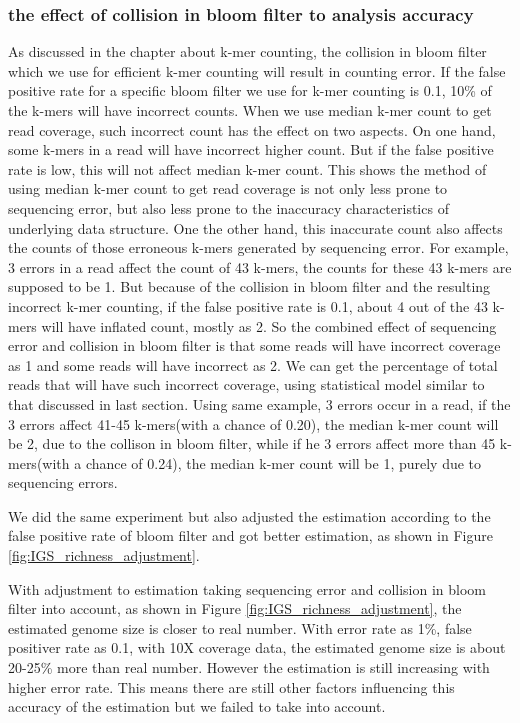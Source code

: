 \documentclass[12pt]{report}
\begin{document}
\subsubsection{the effect of collision in bloom filter to analysis accuracy}
As discussed in the chapter about k-mer counting, the collision in bloom filter
which we use for efficient k-mer counting will result in counting error. If the
false positive rate for a specific bloom filter we use for k-mer counting is
0.1, 10\% of the k-mers will have incorrect counts. When we use median k-mer
count to get read coverage, such incorrect count has the effect on two aspects.
On one hand, some k-mers in a read will have incorrect higher count. But if the
 false
positive rate is low, this will not affect median k-mer count. This shows the
method of using median k-mer count to get read coverage is not only less prone
to sequencing error, but also less prone to the inaccuracy characteristics of
underlying data structure. One the other hand, this inaccurate count also
affects the counts of those erroneous k-mers generated by sequencing error. For
example, 3 errors in a read affect the count of 43 k-mers, the counts for these
43 k-mers are supposed to be 1. But because of the collision in bloom filter
and the resulting incorrect k-mer counting, if the false positive rate is 0.1,
about 4 out of the 43 k-mers will have inflated count, mostly as 2. So the
combined effect of sequencing error and collision in bloom filter is that some
reads will have incorrect coverage as 1 and some reads will have incorrect as
2. We can get the percentage of total reads that will have such incorrect
coverage, using statistical model similar to that discussed in last section.
Using same example, 3 errors occur in a read, if the 3 errors affect 41-45
k-mers(with a chance of 0.20), the median k-mer count will be 2, due to the 
collison in bloom filter, while if he 3 errors affect more than 45 k-mers(with 
a chance of 0.24), the median k-mer count will be 1, purely due to sequencing 
errors. 

We did the same experiment but also adjusted the estimation according to the 
false positive rate of bloom filter and got better estimation, as shown in
Figure \ref{fig:IGS_richness_adjustment}.

With adjustment to estimation taking sequencing error and collision in bloom
filter into account, as shown in Figure \ref{fig:IGS_richness_adjustment}, the 
estimated genome size is closer to real number. With error rate as 1\%,
false positiver rate as 0.1, with 10X coverage data, the estimated genome size
is about 20-25\% more than real number. However the estimation is still 
increasing with higher
error rate. This means there are still other factors influencing this
accuracy of the estimation but we failed to take into account.
\end{document}
